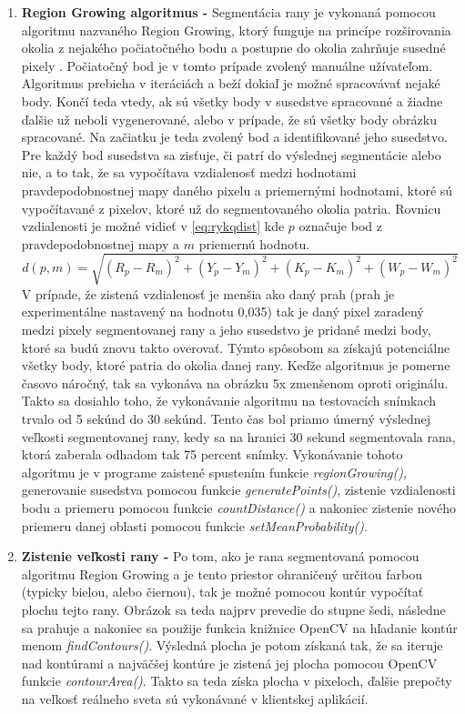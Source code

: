 \begin{enumerate}
    \item \textbf{Region Growing algoritmus -} Segmentácia rany je vykonaná pomocou algoritmu nazvaného Region Growing, ktorý funguje na princípe rozširovania okolia z nejakého počiatočného bodu a postupne do okolia zahrňuje susedné pixely \cite{AHMADFAUZI201574}. Počiatočný bod je v tomto prípade zvolený manuálne užívateľom. Algoritmus prebieha v iteráciách a beží dokiaľ je možné spracovávať nejaké body. Končí teda vtedy, ak sú všetky body v susedstve spracované a žiadne ďalšie už neboli vygenerované, alebo v prípade, že sú všetky body obrázku spracované. Na začiatku je teda zvolený bod a identifikované jeho susedstvo. Pre každý bod susedstva sa zisťuje, či patrí do výslednej segmentácie alebo nie, a to tak, že sa vypočítava vzdialenosť medzi hodnotami pravdepodobnostnej mapy daného pixelu a priemernými hodnotami, ktoré sú vypočítavané z pixelov, ktoré už do segmentovaného okolia patria. Rovnicu vzdialenosti je možné vidieť v \ref{eq:rykqdist} kde $p$ označuje bod z pravdepodobnostnej mapy a $m$ priemernú hodnotu. 
    \begin{equation}
    \label{eq:rykqdist}
    d(p, m) = \sqrt{{(R_{p} - R_{m})}^2 + {(Y_{p} - Y_{m})}^2 + {(K_{p} - K_{m})}^2 + {(W_{p} - W_{m})}^2}
    \end{equation}
    V prípade, že zistená vzdialenosť je menšia ako daný prah (prah je experimentálne nastavený na hodnotu 0,035) tak je daný pixel zaradený medzi pixely segmentovanej rany a jeho susedstvo je pridané medzi body, ktoré sa budú znovu takto overovať. Týmto spôsobom sa získajú potenciálne všetky body, ktoré patria do okolia danej rany. Keďže algoritmus je pomerne časovo náročný, tak sa vykonáva na obrázku 5x zmenšenom oproti originálu. Takto sa dosiahlo toho, že vykonávanie algoritmu na testovacích snímkach trvalo od 5 sekúnd do 30 sekúnd. Tento čas bol priamo úmerný výslednej veľkosti segmentovanej rany, kedy sa na hranici 30 sekund segmentovala rana, ktorá zaberala odhadom tak 75 percent snímky. Vykonávanie tohoto algoritmu je v programe zaistené spustením funkcie \textit{regionGrowing()}, generovanie susedstva pomocou funkcie \textit{generatePoints()}, zistenie vzdialenosti bodu a priemeru pomocou funkcie \textit{countDistance()} a nakoniec zistenie nového priemeru danej oblasti pomocou funkcie \textit{setMeanProbability()}.
    
    \item \textbf{Zistenie veľkosti rany -} Po tom, ako je rana segmentovaná pomocou algoritmu Region Growing a  je tento priestor ohraničený určitou farbou (typicky bielou, alebo čiernou), tak je možné pomocou kontúr vypočítať plochu tejto rany. Obrázok sa teda najprv prevedie do stupne šedi, následne sa prahuje a nakoniec sa použije funkcia knižnice OpenCV na hľadanie kontúr menom \textit{findContours()}. Výsledná plocha je potom získaná tak, že sa iteruje nad kontúrami a najväčšej kontúre je zistená jej plocha pomocou OpenCV funkcie \textit{contourArea()}. Takto sa teda získa plocha v pixeloch, ďalšie prepočty na veľkosť reálneho sveta sú vykonávané v klientskej aplikácií. 
\end{enumerate}


